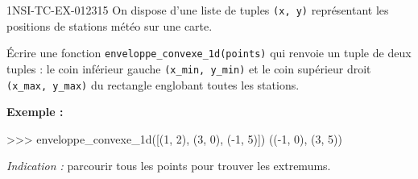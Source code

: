 \begin{exercice}{1NSI-TC-EX-012}{3}{15}
On dispose d'une liste de tuples \lstinline{(x, y)} représentant les positions de
stations météo sur une carte.

Écrire une fonction \lstinline{enveloppe_convexe_1d(points)} qui renvoie un tuple de
deux tuples : le coin inférieur gauche \lstinline{(x_min, y_min)} et le coin
supérieur droit \lstinline{(x_max, y_max)} du rectangle englobant toutes les stations.

\textbf{Exemple :}
\begin{console}
>>> enveloppe_convexe_1d([(1, 2), (3, 0), (-1, 5)])
((-1, 0), (3, 5))
\end{console}

\textit{Indication :} parcourir tous les points pour trouver les extremums.
\end{exercice}
